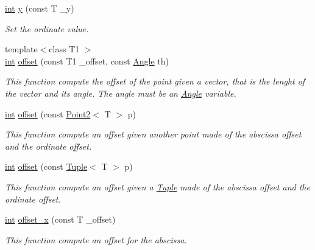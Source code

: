 \begin{DoxyCompactItemize}
\mbox{\hyperlink{draw_8hh_aa620a13339ac3a1177c86edc549fda9b}{int}} \mbox{\hyperlink{class_point2_ab0682ac817d07137c4d2e6175663a008}{y}} (const T \+\_\+y)
\begin{DoxyCompactList}\small\item\em Set the ordinate value. \end{DoxyCompactList}\item 
{\footnotesize template$<$class T1 $>$ }\\\mbox{\hyperlink{draw_8hh_aa620a13339ac3a1177c86edc549fda9b}{int}} \mbox{\hyperlink{class_point2_af484708a23f679425d8434bc24387ab8}{offset}} (const T1 \+\_\+offset, const \mbox{\hyperlink{class_angle}{Angle}} th)
\begin{DoxyCompactList}\small\item\em This function compute the offset of the point given a vector, that is the lenght of the vector and its angle. The angle must be an {\ttfamily \mbox{\hyperlink{class_angle}{Angle}}} variable. \end{DoxyCompactList}\item 
\mbox{\hyperlink{draw_8hh_aa620a13339ac3a1177c86edc549fda9b}{int}} \mbox{\hyperlink{class_point2_a206d80b5b86b22039f7565dc2b8bdab1}{offset}} (const \mbox{\hyperlink{class_point2}{Point2}}$<$ T $>$ p)
\begin{DoxyCompactList}\small\item\em This function compute an offset given another point made of the abscissa offset and the ordinate offset. \end{DoxyCompactList}\item 
\mbox{\hyperlink{draw_8hh_aa620a13339ac3a1177c86edc549fda9b}{int}} \mbox{\hyperlink{class_point2_af25c5bac4c7273d5af0488d7f1196be5}{offset}} (const \mbox{\hyperlink{class_tuple}{Tuple}}$<$ T $>$ p)
\begin{DoxyCompactList}\small\item\em This function compute an offset given a {\ttfamily \mbox{\hyperlink{class_tuple}{Tuple}}} made of the abscissa offset and the ordinate offset. \end{DoxyCompactList}\item 
\mbox{\hyperlink{draw_8hh_aa620a13339ac3a1177c86edc549fda9b}{int}} \mbox{\hyperlink{class_point2_a5054bfe0d4f8b38cdc6a375624c388b2}{offset\+\_\+x}} (const T \+\_\+offset)
\begin{DoxyCompactList}\small\item\em This function compute an offset for the abscissa. \end{DoxyCompactList}\item 

\end{DoxyCompactItemize}

